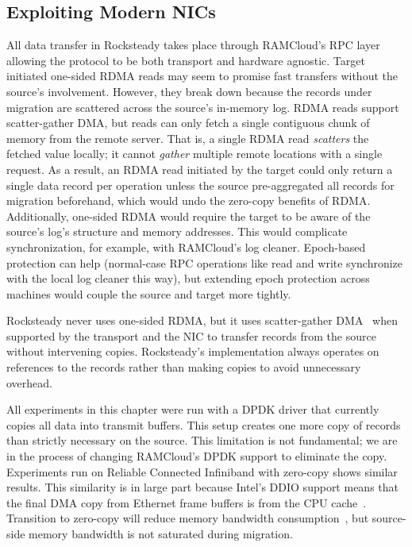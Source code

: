 \subsection{Exploiting Modern NICs}
\label{sec:hw}
All data transfer in Rocksteady takes place through RAMCloud's RPC layer
allowing the protocol to be both transport and hardware agnostic. Target
initiated one-sided RDMA reads may seem to promise fast transfers without the
source's involvement. However, they break down because the records under migration are
scattered across the source's in-memory log. RDMA reads support
scatter-gather DMA, but reads can only fetch a single contiguous chunk of
memory from the remote server. That is, a single RDMA read {\em scatters} the
fetched value locally; it cannot {\em gather} multiple remote locations with a
single request. As a result, an RDMA read initiated by the target could only
return a single data record per operation unless the source
pre-aggregated all records for migration beforehand, which would undo the
zero-copy benefits of RDMA.
Additionally, one-sided RDMA would require the target
to be aware of the source's log's structure and memory addresses. This
would complicate synchronization, for example, with RAMCloud's log cleaner.
Epoch-based protection can help (normal-case RPC operations like read and write
synchronize with the local log cleaner this way), but extending epoch
protection across machines would couple the source and target more
tightly.

Rocksteady never uses one-sided RDMA, but it uses scatter-gather
DMA~\cite{ramcloud} when supported by the transport and the NIC to transfer
records from the source without intervening copies.
Rocksteady's implementation always operates on references to 
the records rather than making copies to avoid
unnecessary overhead.

All experiments in this chapter were run with a DPDK driver that currently
copies all data into transmit buffers. This setup creates one more copy of records
than strictly necessary on the source. This limitation is not fundamental;
we are in the process of changing RAMCloud's DPDK support to eliminate the
copy.  Experiments run on Reliable Connected Infiniband with zero-copy shows
similar results. This similarity is in large part because Intel's DDIO
support means that
the final DMA copy from Ethernet frame buffers is from the CPU
cache~\cite{ddio}.
Transition to zero-copy will reduce memory bandwidth
consumption~\cite{kesavan:copy}, but source-side memory bandwidth is not
saturated during migration.

